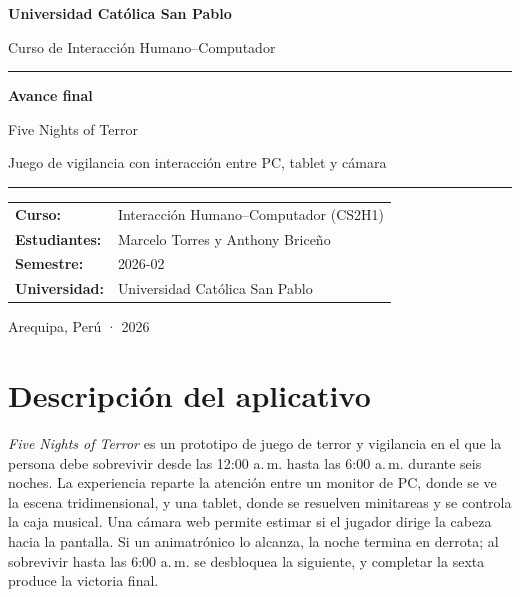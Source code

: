 \documentclass[11pt,a4paper]{article}
\begin{document}
\begin{titlepage}
\thispagestyle{empty}
\begin{center}
\vspace*{1.5cm}
{\Large\bfseries Universidad Católica San Pablo\par}
\vspace{0.35cm}
{\large Curso de Interacción Humano--Computador\par}
\vspace{1.8cm}
{\color{Rojo}\rule{0.75\textwidth}{2pt}\par}
\vspace{0.55cm}
{\Huge\bfseries Avance final\par}
\vspace{0.45cm}
{\LARGE Five Nights of Terror\par}
\vspace{0.35cm}
{\large Juego de vigilancia con interacción entre PC, tablet y cámara\par}
\vspace{0.55cm}
{\color{Rojo}\rule{0.75\textwidth}{2pt}\par}
\vspace{1.8cm}
\begin{tabular}{>{\bfseries}p{3.5cm}p{8cm}}
Curso: & Interacción Humano--Computador (CS2H1)\\
Estudiantes: & Marcelo Torres y Anthony Briceño\\
Semestre: & 2026-02\\
Universidad: & Universidad Católica San Pablo\\
\end{tabular}
\vfill
{\large Arequipa, Perú · 2026\par}
\end{center}
\end{titlepage}

\section{Descripción del aplicativo}

\textit{Five Nights of Terror} es un prototipo de juego de terror y vigilancia en el que la persona debe sobrevivir desde las 12:00 a.\,m. hasta las 6:00 a.\,m. durante seis noches. La experiencia reparte la atención entre un monitor de PC, donde se ve la escena tridimensional, y una tablet, donde se resuelven minitareas y se controla la caja musical. Una cámara web permite estimar si el jugador dirige la cabeza hacia la pantalla. Si un animatrónico lo alcanza, la noche termina en derrota; al sobrevivir hasta las 6:00 a.\,m. se desbloquea la siguiente, y completar la sexta produce la victoria final.
\end{document}
